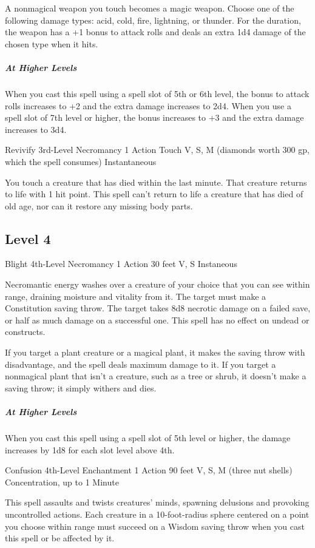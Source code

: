 {A nonmagical weapon you touch becomes a magic weapon. Choose one of the following damage types: acid, cold, fire, lightning, or thunder. For the duration, the weapon has a +1 bonus to attack rolls and deals an extra 1d4 damage of the chosen type when it hits.

\subparagraph*{At Higher Levels} When you cast this spell using a spell slot of 5th or 6th level, the bonus to attack rolls increases to +2 and the extra damage increases to 2d4. When you use a spell slot of 7th level or higher, the bonus increases to +3 and the extra damage increases to 3d4.

\DndSpellHeader
  {Revivify}
  {3rd-Level Necromancy}
  {1 Action}
  {Touch}
  {V, S, M (diamonds worth 300 gp, which the spell consumes)}
  {Instantaneous}

You touch a creature that has died within the last minute. That creature returns to life with 1 hit point. This spell can’t return to life a creature that has died of old age, nor can it restore any missing body parts.

\subsection*{Level 4}

\DndSpellHeader
  {Blight}
  {4th-Level Necromancy}
  {1 Action}
  {30 feet}
  {V, S}
  {Instaneous}

Necromantic energy washes over a creature of your choice that you can see within range, draining moisture and vitality from it. The target must make a Constitution saving throw. The target takes 8d8 necrotic damage on a failed save, or half as much damage on a successful one. This spell has no effect on undead or constructs.

If you target a plant creature or a magical plant, it makes the saving throw with disadvantage, and the spell deals maximum damage to it. If you target a nonmagical plant that isn’t a creature, such as a tree or shrub, it doesn’t make a saving throw; it simply withers and dies.

\subparagraph*{At Higher Levels} When you cast this spell using a spell slot of 5th level or higher, the damage increases by 1d8 for each slot level above 4th.

\DndSpellHeader
  {Confusion}
  {4th-Level Enchantment}
  {1 Action}
  {90 feet}
  {V, S, M (three nut shells)}
  {Concentration, up to 1 Minute}

This spell assaults and twists creatures’ minds, spawning delusions and provoking uncontrolled actions. Each creature in a 10-foot-radius sphere centered on a point you choose within range must succeed on a Wisdom saving throw when you cast this spell or be affected by it.

}
